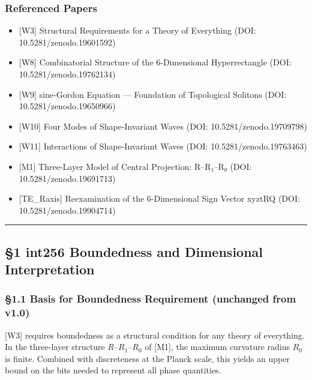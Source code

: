 \documentclass[a4paper,11pt]{article}
\providecommand{\tightlist}{\setlength{\itemsep}{0pt}\setlength{\parskip}{0pt}}
\begin{document}
\subsubsection{Referenced Papers}\label{referenced-papers}

\begin{itemize}
\tightlist
\item
  {[}W3{]} Structural Requirements for a Theory of Everything (DOI:
  10.5281/zenodo.19601592)
\item
  {[}W8{]} Combinatorial Structure of the 6-Dimensional Hyperrectangle
  (DOI: 10.5281/zenodo.19762134)
\item
  {[}W9{]} sine-Gordon Equation --- Foundation of Topological Solitons
  (DOI: 10.5281/zenodo.19650966)
\item
  {[}W10{]} Four Modes of Shape-Invariant Waves (DOI:
  10.5281/zenodo.19709798)
\item
  {[}W11{]} Interactions of Shape-Invariant Waves (DOI:
  10.5281/zenodo.19763463)
\item
  {[}M1{]} Three-Layer Model of Central Projection: R--R₁--R₀ (DOI:
  10.5281/zenodo.19691713)
\item
  {[}TE\_Raxis{]} Reexamination of the 6-Dimensional Sign Vector xyztRQ
  (DOI: 10.5281/zenodo.19904714)
\end{itemize}

\begin{center}\rule{0.5\linewidth}{0.5pt}\end{center}

\subsection{§1 int256 Boundedness and Dimensional
Interpretation}\label{int256-boundedness-and-dimensional-interpretation}

\subsubsection{§1.1 Basis for Boundedness Requirement (unchanged from
v1.0)}\label{basis-for-boundedness-requirement-unchanged-from-v1.0}

{[}W3{]} requires boundedness as a structural condition for any theory
of everything. In the three-layer structure \(R\)--\(R_1\)--\(R_0\) of
{[}M1{]}, the maximum curvature radius \(R_0\) is finite. Combined with
discreteness at the Planck scale, this yields an upper bound on the bits
needed to represent all phase quantities.
\end{document}
